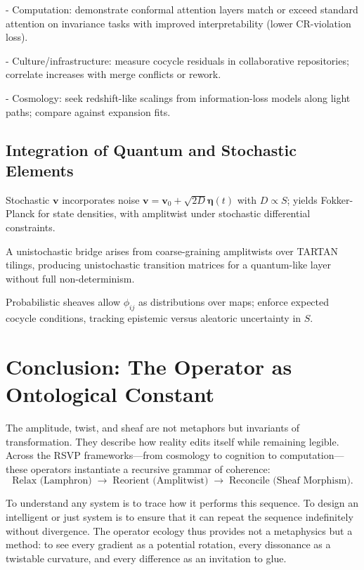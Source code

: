 \documentclass[12pt]{article}
\begin{document}
- Computation: demonstrate conformal attention layers match or exceed standard attention on invariance tasks with improved interpretability (lower CR-violation loss).

- Culture/infrastructure: measure cocycle residuals in collaborative repositories; correlate increases with merge conflicts or rework.

- Cosmology: seek redshift-like scalings from information-loss models along light paths; compare against expansion fits.

\subsection{Integration of Quantum and Stochastic Elements}

Stochastic $\mathbf{v}$ incorporates noise $\mathbf{v} = \mathbf{v}_0 + \sqrt{2D} \boldsymbol{\eta}(t)$ with $D \propto S$; yields Fokker-Planck for state densities, with amplitwist under stochastic differential constraints.

A unistochastic bridge arises from coarse-graining amplitwists over TARTAN tilings, producing unistochastic transition matrices for a quantum-like layer without full non-determinism.

Probabilistic sheaves allow $\phi_{ij}$ as distributions over maps; enforce expected cocycle conditions, tracking epistemic versus aleatoric uncertainty in $S$.

\section{Conclusion: The Operator as Ontological Constant}

The amplitude, twist, and sheaf are not metaphors but invariants of transformation.
They describe how reality edits itself while remaining legible.
Across the RSVP frameworks---from cosmology to cognition to computation---these operators instantiate a recursive grammar of coherence:
\[
\text{Relax (Lamphron)} \;\rightarrow\;
\text{Reorient (Amplitwist)} \;\rightarrow\;
\text{Reconcile (Sheaf Morphism)}.
\]

To understand any system is to trace how it performs this sequence.
To design an intelligent or just system is to ensure that it can repeat the sequence indefinitely without divergence.
The operator ecology thus provides not a metaphysics but a method:
to see every gradient as a potential rotation, every dissonance as a twistable curvature, and every difference as an invitation to glue.
\end{document}
